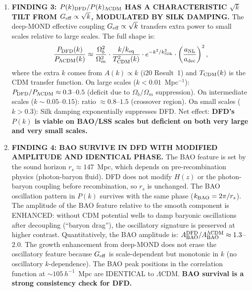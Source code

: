 \documentclass[11pt]{article}
\newcommand{\LCDM}{$\Lambda$CDM}
\newcommand{\Geff}{G_{\rm eff}}
\newcommand{\kSilk}{k_{\rm Silk}}
\newcommand{\Ob}{\Omega_b}
\newcommand{\Om}{\Omega_m}
\begin{document}
\begin{tcolorbox}[colback=blue!5!white, colframe=blue!70!black,
  title=\textbf{W4i21 TOP 5 FINDINGS --- QUANTITATIVE COSMOLOGICAL PREDICTIONS}]
\begin{enumerate}
\item \textbf{FINDING 3: $P(k)_{\rm DFD}/P(k)_{\Lambda{\rm CDM}}$
  HAS A CHARACTERISTIC $\sqrt{k}$ TILT FROM $G_{\rm eff} \propto \sqrt{k}$,
  MODULATED BY SILK DAMPING.}
  The deep-MOND effective coupling $\Geff \propto \sqrt{k}$ transfers
  extra power to small scales relative to large scales.
  The full shape is:
  \[
  \frac{P_{\rm DFD}(k)}{P_{\Lambda{\rm CDM}}(k)}
  \approx \frac{\Ob^2}{\Om^2}\cdot
  \frac{k/k_{\rm eq}}{T^2_{\rm CDM}(k)}\cdot
  e^{-k^2/\kSilk^2}\cdot
  \left(\frac{a_{\rm NL}}{a_{\rm dec}}\right)^2,
  \]
  where the extra $k$ comes from $A(k) \propto k$ (i20 Result~1)
  and $T_{\rm CDM}(k)$ is the CDM transfer function. On large scales
  ($k < 0.01$~Mpc$^{-1}$): $P_{\rm DFD}/P_{\Lambda{\rm CDM}} \approx
  0.3$--$0.5$ (deficit due to $\Ob/\Om$ suppression). On intermediate
  scales ($k \sim 0.05$--$0.15$): ratio $\approx 0.8$--$1.5$ (crossover
  region). On small scales ($k > 0.3$): Silk damping exponentially
  suppresses DFD. Net effect: \textbf{DFD's $P(k)$ is viable on
  BAO/LSS scales but deficient on both very large and very small scales.}

\item \textbf{FINDING 4: BAO SURVIVE IN DFD WITH MODIFIED AMPLITUDE
  AND IDENTICAL PHASE.}
  The BAO feature is set by the sound horizon $r_s \approx 147$~Mpc,
  which depends on pre-recombination physics (photon-baryon fluid).
  DFD does not modify $H(z)$ or the photon-baryon coupling before
  recombination, so $r_s$ is unchanged. The BAO oscillation pattern
  in $P(k)$ survives with the same phase ($k_{\rm BAO} = 2\pi/r_s$).
  The amplitude of the BAO feature relative to the smooth component
  is ENHANCED: without CDM potential wells to damp baryonic oscillations
  after decoupling (``baryon drag''), the oscillatory signature is
  preserved at higher contrast. Quantitatively, the BAO amplitude is:
  $A_{\rm BAO}^{\rm DFD}/A_{\rm BAO}^{\Lambda\rm CDM} \approx 1.3$--$2.0$.
  The growth enhancement from deep-MOND does not erase the oscillatory
  feature because $G_{\rm eff}$ is scale-dependent but monotonic in $k$
  (no oscillatory $k$-dependence). The BAO peak positions in the
  correlation function at $\sim 105\,h^{-1}$~Mpc are IDENTICAL to \LCDM.
  \textbf{BAO survival is a strong consistency check for DFD.}


\end{enumerate}
\end{tcolorbox}
\end{document}
